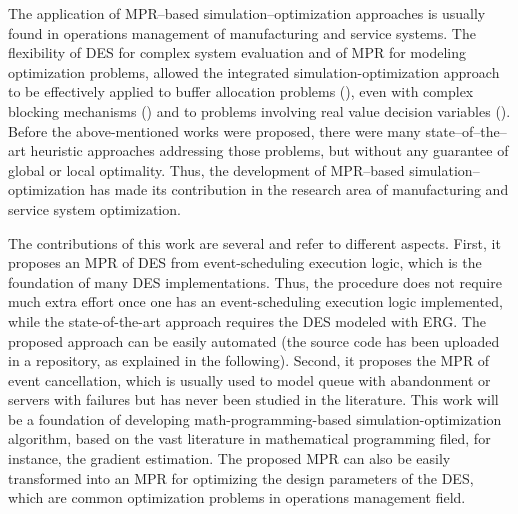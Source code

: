 \documentclass[suppldata]{interact}
\theoremstyle{plain}
\theoremstyle{definition}
\theoremstyle{remark}
\begin{document}
The application of MPR--based simulation--optimization approaches is usually found in operations management of manufacturing and service systems. %
The flexibility of DES for complex system evaluation and of MPR for modeling optimization problems, allowed the integrated simulation-optimization approach to be effectively applied to buffer allocation problems (\cite{zhang2020BAP}), even with complex blocking mechanisms (\cite{pedrielli2015integrated}) and to problems involving real value decision variables (\cite{tan2015mathematical,zhang2020models}). 
Before the above-mentioned works were proposed, there were many state--of--the--art heuristic approaches addressing those problems, but without any guarantee of global or local optimality. Thus, the development of MPR--based simulation--optimization has made its contribution in the research area of manufacturing and service system optimization.


The contributions of this work are several and refer to different aspects. First, it proposes an MPR of DES from event-scheduling execution logic, which is the foundation of many DES implementations. Thus, the procedure does not require much extra effort once one has an event-scheduling execution logic implemented, while the state-of-the-art approach requires the DES modeled with ERG. The proposed approach can be easily automated (the source code has been uploaded in a repository, as explained in the following).  Second, it proposes the MPR of event cancellation, which is usually used to model queue with abandonment or servers with failures but has never been studied in the literature. This work will be a foundation of developing math-programming-based simulation-optimization algorithm, based on the vast literature in mathematical programming filed, for instance, the gradient estimation. 
The proposed MPR can also be easily transformed into an MPR for optimizing the design parameters of the DES, which are common optimization problems in operations management field.  
\end{document}
